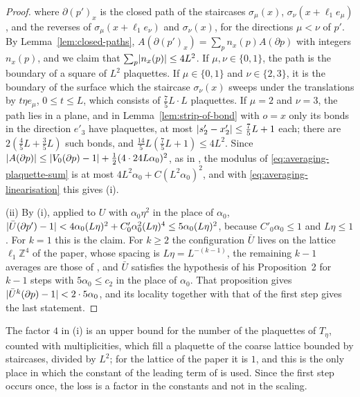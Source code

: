 \documentclass[11pt]{preprint}
\DeclarePairedDelimiter{\abs}{\lvert}{\rvert}
\numberwithin{equation}{section}
\theoremstyle{definition}
\theoremstyle{remark}
\theoremstyle{plain}
\begin{document}
\begin{proof}
where $\partial(p')_x$ is the closed path of the staircases $\sigma_\mu(x)$, $\sigma_\nu(x + \ell_1e_\mu)$, and the reverses of $\sigma_\mu(x + \ell_1e_\nu)$ and $\sigma_\nu(x)$, for the directions $\mu < \nu$ of $p'$. By Lemma~\ref{lem:closed-paths}, $A(\partial(p')_x) = \sum_pn_x(p)A(\partial p)$ with integers $n_x(p)$, and we claim that $\sum_p\abs{n_x(p)} \leq 4L^2$. If $\mu, \nu \in \{ 0, 1 \}$, the path is the boundary of a square of $L^2$ plaquettes. If $\mu \in \{ 0, 1 \}$ and $\nu \in \{ 2, 3 \}$, it is the boundary of the surface which the staircase $\sigma_\nu(x)$ sweeps under the translations by $t\eta e_\mu$, $0 \leq t \leq L$, which consists of $\frac75L \cdot L$ plaquettes. If $\mu = 2$ and $\nu = 3$, the path lies in a plane, and in Lemma~\ref{lem:strip-of-bond} with $o = x$ only its bonds in the direction $e'_3$ have plaquettes, at most $\abs{s'_2 - x'_2} \leq \frac75L + 1$ each; there are $2(\frac45L + \frac35L)$ such bonds, and $\frac{14}{5}L(\frac75L + 1) \leq 4L^2$. Since $\abs{A(\partial p)} \leq \abs{V_0(\partial p) - 1} + \frac12(4 \cdot 24L\alpha_0)^2$, as in \cite[(49)]{BalabanAVG}, the modulus of \eqref{eq:averaging-plaquette-sum} is at most $4L^2\alpha_0 + C(L^2\alpha_0)^2$, and with \eqref{eq:averaging-linearisation} this gives (i).

(ii) By (i), applied to $U$ with $\alpha_0\eta^2$ in the place of $\alpha_0$, $\abs{\bar U(\partial p') - 1} < 4\alpha_0(L\eta)^2 + C'_0\alpha_0^2(L\eta)^4 \leq 5\alpha_0(L\eta)^2$, because $C'_0\alpha_0 \leq 1$ and $L\eta \leq 1$. For $k = 1$ this is the claim. For $k \geq 2$ the configuration $\bar U$ lives on the lattice $\ell_1\mathbb Z^4$ of the paper, whose spacing is $L\eta = L^{-(k-1)}$, the remaining $k - 1$ averages are those of \cite{BalabanAVG}, and $\bar U$ satisfies the hypothesis \cite[(52)]{BalabanAVG} of his Proposition~2 for $k - 1$ steps with $5\alpha_0 \leq c_2$ in the place of $\alpha_0$. That proposition gives $\abs{\bar U^k(\partial p) - 1} < 2 \cdot 5\alpha_0$, and its locality together with that of the first step gives the last statement.
\end{proof}

The factor $4$ in (i) is an upper bound for the number of the plaquettes of $T_\eta$, counted with multiplicities, which fill a plaquette of the coarse lattice bounded by staircases, divided by $L^2$; for the lattice of the paper it is $1$, and this is the only place in which the constant of the leading term of \cite[(51)]{BalabanAVG} is used. Since the first step occurs once, the loss is a factor in the constants and not in the scaling.
\end{document}
